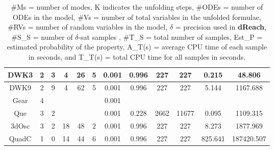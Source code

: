 \begin{table}[h]
\begin{tabular}{c|c|c|c|c|c|c|c|c|c|c|c}
    DWK3      & 2       & 3 & 4      & 26    & 5     & 0.001 & 0.996  & 227       & 227      & 0.215    & 48.806      \\ \hline
    DWK9      & 2       & 9 & 4      & 62    & 5     & 0.001 & 0.996  & 227       & 227      & 5.144   &  1167.688      \\ \hline
    Gear      & 4       & ~ & ~      & ~     & ~     & 0.001 & ~      & ~         & ~        & ~     & ~          \\ \hline
    Que       & 3       & 2 & ~      & ~     & ~     & 0.001 & 0.228      & 2662         & 11677        & 0.095   & 1109.315   \\ \hline
    3dOsc     & 3       & 2 & 18      & 48     & 2     & 0.001 & 0.996      & 227         & 227        & 8.273  & 1877.969   \\ \hline
    QuadC     & 1       & 0 & 14      & 44     & 6     & 0.001 & 0.996      & 227         & 227        & 825.641 & 187420.507   \\ \hline
    \end{tabular}
    \caption {\#Ms = number of modes, K indicates the unfolding steps, \#ODEs = number of ODEs in the model, \#Vs = number of total variables in the unfolded formulae, \#RVs = number of random variables in the model, $\delta$ = precision used in 
{\bf dReach}, \#S\_S = number of $\delta$-sat samples , \#T\_S = total number of samples, Est\_P = estimated 
probability of the property,  A\_T(s) = average CPU time of each sample in seconds, and T\_T(s) = total CPU time for all samples in seconds.}
    \label{table:exp}
\end{table}
